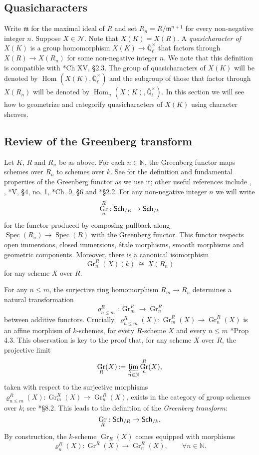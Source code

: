 \documentclass[10pt]{amsart}
\theoremstyle{plain}
\theoremstyle{definition}
\newcommand{\NN}{{\mathbb{N}}}
\newcommand{\EE}{\mathbb{\bar Q}_\ell}
\newcommand{\Fq}{k}
\newcommand{\EEx}{\EE^\times}
\newcommand{\m}{{\mathfrak{m}}}
\DeclareMathOperator{\Hom}{Hom}
\DeclareMathOperator{\Gr}{Gr}
\newcommand{\Spec}[1]{{\operatorname{Spec}(#1)}}
\newcommand{\ceq}{{\, :=\, }}
\newcommand{\iso}{{\ \cong\ }}
\newcommand{\catname}[1]{\normalfont{\textsf{#1}}}
\newcommand{\Sch}[1]{{\catname{Sch}_{/#1}}}
\begin{document}
\subsection{Quasicharacters}\label{ssec:quasicharacters}

Write $\m$ for the maximal ideal of $R$ and set $R_n = R/\m^{n+1}$ for every non-negative integer $n$.
Suppose $X \in \mathcal{N}$.
Note that $X(K) = X(R)$.
A \emph{quasicharacter of $X(K)$} is a group homomorphism $X(K) \to \EEx$ that factors through
$X(R) \to X(R_n)$ for some non-negative integer $n$.
We note that this definition is compatible with \cite{cassels-frohlich:AlgebraicNumberTheory}*{Ch XV, \S 2.3}.
The group of quasicharacters of $X(K)$ will be denoted by 
$\Hom_\text{}(X(K),\EEx)$
 and the subgroup of those that factor through $X(R_n)$ will be denoted by $\Hom_n(X(K),\EEx)$.
In this section we will see how to geometrize and categorify quasicharacters of $X(K)$ using character sheaves.

\subsection{Review of the Greenberg transform} \label{ssec:rev_Greenberg}

Let $K$, $R$ and $R_n$ be as above.
For each $n \in \NN$, the Greenberg functor maps schemes over $R_n$ to schemes over $\Fq$.
See \cite{bertapelle-gonzales:Greenberg} for the definition and fundamental properties of the
Greenberg functor as we use it; other useful references include
\cite{greenberg:61}, \cite{greenberg:63a},
\cite{demazure-gabriel:GroupesAlgebriques}*{V, \S 4, no. 1},
\cite{bosch-lutkebohmert-reynaud:NeronModels}*{Ch. 9, \S 6} and
\cite{nicaise-sebag:motivicSerre}*{\S 2.2}. %
%
For any non-negative integer $n$ we will write
\[
\Gr^R_n : \Sch{R} \to \Sch{\Fq}
\]
for the functor produced by composing pullback along $\Spec{R_n} \to \Spec{R}$ with the Greenberg functor. 
This functor respects open immersions, closed immersions, \'etale morphisms, smooth morphisms and
geometric components.  Moreover, there is a canonical isomorphism
\[
\Gr^R_n(X)(\Fq) \iso X(R_n)
\]
for any scheme $X$ over $R$.

For any $n\leq m$,  the surjective ring homomorphism $R_{m} \to R_n$ determines a
natural transformation 
\[
\varrho^R_{n\leq m} : \Gr^R_{m} \to \Gr^R_n
\]
between additive functors.
Crucially, $\varrho^R_{n\leq m}(X): \Gr^R_{m}(X)\to \Gr^R_n(X)$ is an affine morphism of $\Fq$-schemes,
for every $R$-scheme $X$ and every $n\leq m$ \cite{bertapelle-gonzales:Greenberg}*{Prop 4.3}.
This observation is key to the proof that, for any scheme $X$ over $R$, the projective limit 
\[
\Gr_R(X) \ceq \varprojlim_{n\in \NN} \Gr^R_n(X),
\]
taken with respect to the surjective morphisms $\varrho^R_{n\leq m}(X) : \Gr^R_{m}(X) \to \Gr^R_n(X)$,
exists in the category of group schemes over $\Fq$;
see \cite{EGAIV3}*{\S 8.2}.
This leads to the definition of the {\it Greenberg transform}:
\[
\Gr_R : \Sch{R} \to \Sch{\Fq}.
\]
By construction, the $\Fq$-scheme $\Gr_R(X)$ comes equipped with morphisms 
\[
\varrho^R_n(X) : \Gr^R(X) \to \Gr^R_n(X),\qquad \forall n\in \NN.
\]
\end{document}
